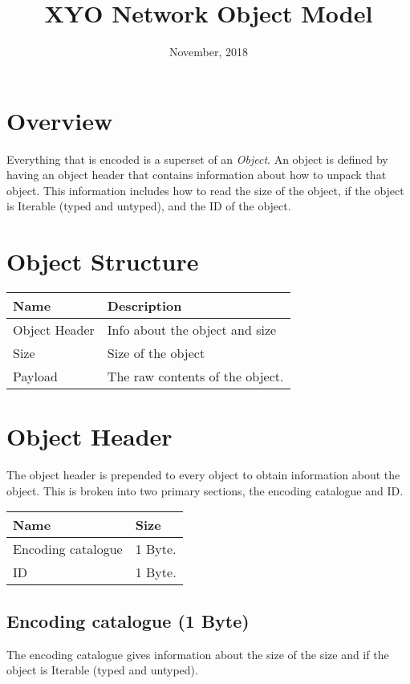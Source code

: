 \documentclass[11pt]{article}
\title{XYO Network Object Model}
\date{November, 2018}
\begin{document}
\maketitle


\section{Overview}
Everything that is encoded is a superset of an \textit{Object}. An object is defined by having an object header that contains information about how to unpack that object. This information includes how to read the size of the object, if the object is Iterable (typed and untyped), and the ID of the object.

\section{Object Structure}
\begin{center}
\begin{tabular}{ |l|l| } 
\hline
\textbf{Name} & \textbf{Description}\\
\hline
Object Header & Info about the object and size \\   
Size & Size of the object \\  
Payload & The raw contents of the object. \\  
\hline
\end{tabular}
\end{center}

\section{Object Header}
The object header is prepended to every object to obtain information about the object. This is broken into two primary sections, the encoding catalogue and ID. 

\begin{center}
\begin{tabular}{ |l|l| } 
\hline
\textbf{Name} & \textbf{Size}\\
\hline
Encoding catalogue & 1 Byte. \\  
ID & 1 Byte. \\  
\hline
\end{tabular}
\end{center}


\subsection{Encoding catalogue (1 Byte)}
The encoding catalogue gives information about the size of the size and if the object is Iterable (typed and untyped).
\end{document}
